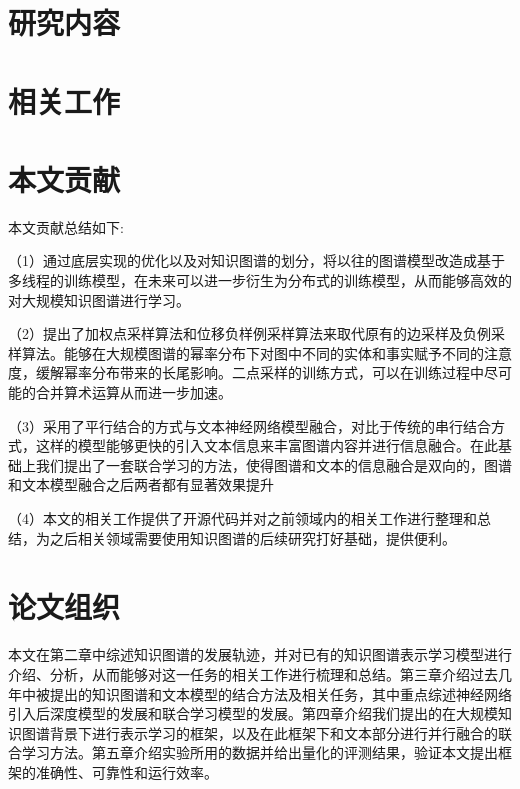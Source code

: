 \section{研究内容}

\section{相关工作}

\section{本文贡献}

  本文贡献总结如下:

  （1）通过底层实现的优化以及对知识图谱的划分，将以往的图谱模型改造成基于多线程的训练模型，在未来可以进一步衍生为分布式的训练模型，从而能够高效的对大规模知识图谱进行学习。
  
  （2）提出了加权点采样算法和位移负样例采样算法来取代原有的边采样及负例采样算法。能够在大规模图谱的幂率分布下对图中不同的实体和事实赋予不同的注意度，缓解幂率分布带来的长尾影响。二点采样的训练方式，可以在训练过程中尽可能的合并算术运算从而进一步加速。
  
  （3）采用了平行结合的方式与文本神经网络模型融合，对比于传统的串行结合方式，这样的模型能够更快的引入文本信息来丰富图谱内容并进行信息融合。在此基础上我们提出了一套联合学习的方法，使得图谱和文本的信息融合是双向的，图谱和文本模型融合之后两者都有显著效果提升
  
  （4）本文的相关工作提供了开源代码并对之前领域内的相关工作进行整理和总结，为之后相关领域需要使用知识图谱的后续研究打好基础，提供便利。

\section{论文组织}

  本文在第二章中综述知识图谱的发展轨迹，并对已有的知识图谱表示学习模型进行介绍、分析，从而能够对这一任务的相关工作进行梳理和总结。第三章介绍过去几年中被提出的知识图谱和文本模型的结合方法及相关任务，其中重点综述神经网络引入后深度模型的发展和联合学习模型的发展。第四章介绍我们提出的在大规模知识图谱背景下进行表示学习的框架，以及在此框架下和文本部分进行并行融合的联合学习方法。第五章介绍实验所用的数据并给出量化的评测结果，验证本文提出框架的准确性、可靠性和运行效率。

